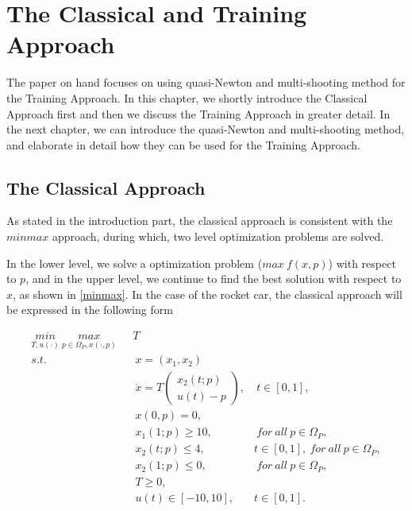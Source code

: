 

\chapter{The Classical and Training Approach}

The paper on hand focuses on using quasi-Newton and multi-shooting method for the Training Approach. In this chapter, we shortly introduce the Classical Approach first and then we discuss the Training Approach in greater detail. In the next chapter, we can introduce the quasi-Newton and multi-shooting method, and elaborate in detail how they can be used for the Training Approach. 



\section{The Classical Approach}

As stated in the introduction part, the classical approach is consistent with the $minmax$ approach, during which, two level optimization problems are solved. 

In the lower level, we solve a optimization problem ($max \  f(x,p)$) with respect to $p$, and in the upper level, we continue to find the best solution with respect to $x$, as shown in \ref{minmax}. In the case of the rocket car, the classical approach will be expressed in the following form

\begin{subequations}
	\begin{align}
		\underset{T, u(\cdot)}{min} \  \underset{ p \in \Omega_P, x(\cdot,p)}{max}  \ \   & \  T \\ 
		s.t.  & \ \ x = (x_1, x_2)   \label{ca_rc_x} \\ 
		& \ \  \dot{x} = T  \begin{pmatrix}  x_2(t;p) \\ u(t)-p   \end{pmatrix}, & \ t \in [0,1],  \label{ca_rc_partial} \\
		& \ \ x(0,p) = 0, \label{ca_rc_t0}\\
		& \ \ x_1(1;p) \geq 10, & \ for \ all \ p \in \Omega_P, \label{ca_rc_x1_t1} \\
		& \ \ x_2(t;p) \leq 4, & t \in [0,1], \ for \ all \ p \in \Omega_P,  \label{ca_rc_x2_tc} \\
		& \ \ x_2(1;p) \leq 0, & \ for \ all \ p \in \Omega_P, \label{ca_rc_x2_t1}  \\
		& \ \ T \geq 0, \\
		& \ \ u(t) \in [-10, 10], & t \in [0,1]. 
	\end{align}
	\label{ca_rc}
\end{subequations}

